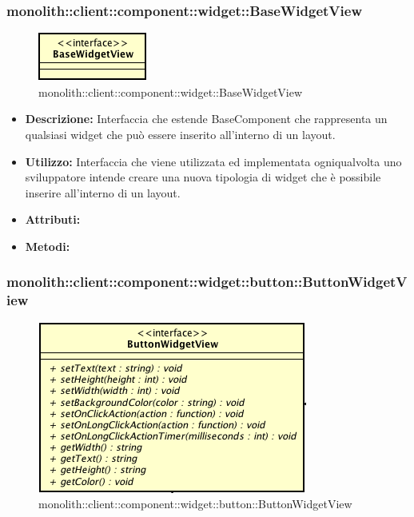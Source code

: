 \subsubsection{monolith::client::component::widget::BaseWidgetView}

\label{monolith::client::component::widget::BaseWidgetView}
\begin{figure}[ht]
	\centering
	\includegraphics[scale=0.5]{Sezioni/SottosezioniST/img/BaseWidgetView.png}
	\caption{monolith::client::component::widget::BaseWidgetView}
\end{figure}

\begin{itemize}
\item \textbf{Descrizione:} Interfaccia che estende BaseComponent che rappresenta un qualsiasi widget che può essere inserito all'interno di un layout.
\item \textbf{Utilizzo:} Interfaccia che viene utilizzata ed implementata ogniqualvolta uno sviluppatore intende creare una nuova tipologia di widget che è possibile inserire all'interno di un layout.
\item \textbf{Attributi:}
\item \textbf{Metodi:}
\end{itemize}

\subsubsection{monolith::client::component::widget::button::ButtonWidgetView}

\label{monolith::client::component::widget::button::ButtonWidgetView}
\begin{figure}[ht]
	\centering
	\includegraphics[scale=0.5]{Sezioni/SottosezioniST/img/ButtonWidgetView.png}
	\caption{monolith::client::component::widget::button::ButtonWidgetView}
\end{figure}

